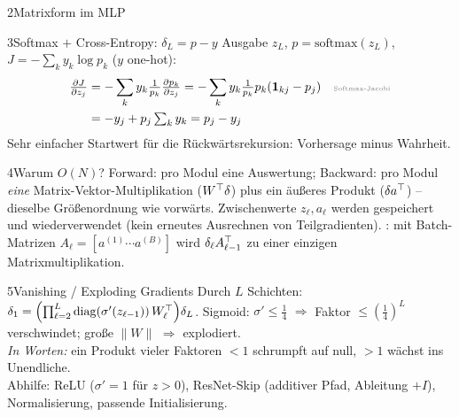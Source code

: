 \begin{hngrid}
\begin{hnp}[raster multicolumn=3,acc=hnpurple]{2}{Matrixform im MLP}
\end{hnp}
%
\begin{hnp}[raster multicolumn=3,acc=hnnavy]{3}{Softmax $+$ Cross-Entropy: $\delta_L=p-y$}
Ausgabe $z_L$, $p=\mathrm{softmax}(z_L)$, $J=-\sum_ky_k\log p_k$ ($y$ one-hot):
\begin{align*}
\tfrac{\partial J}{\partial z_j}&=-\sum_ky_k\tfrac1{p_k}\tfrac{\partial p_k}{\partial z_j}=-\sum_ky_k\tfrac1{p_k}p_k(\I_{kj}-p_j)&&\why{Softmax-Jacobi}\\
&=-y_j+p_j\textstyle\sum_ky_k=p_j-y_j
\end{align*}
Sehr einfacher Startwert für die Rückwärtsrekursion: Vorhersage minus Wahrheit.
\end{hnp}
%
\begin{hnp}[raster multicolumn=3,acc=hngreen]{4}{Warum $O(N)$?}
Forward: pro Modul eine Auswertung; Backward: pro Modul \emph{eine} Matrix-Vektor-Multiplikation ($W^{\top}\delta$) plus ein äußeres Produkt ($\delta a^{\top}$) -- dieselbe Größenordnung wie vorwärts. Zwischenwerte $z_\ell,a_\ell$ werden gespeichert und wiederverwendet (kein erneutes Ausrechnen von Teilgradienten). : mit Batch-Matrizen $A_{\ell}=[a^{(1)}\cdots a^{(B)}]$ wird $\delta_\ell A_{\ell-1}^{\top}$ zu einer einzigen Matrixmultiplikation.
\end{hnp}
%
\begin{hnp}[raster multicolumn=3,acc=hnrose]{5}{Vanishing / Exploding Gradients}
Durch $L$ Schichten: $\delta_1=\Bigl(\prod_{\ell=2}^{L}\mathrm{diag}(\sigma'(z_{\ell-1}))\,W_\ell^{\top}\Bigr)\delta_L$. Sigmoid: $\sigma'\le\frac14$ $\Rightarrow$ Faktor $\le(\frac14)^{L}$ verschwindet; große $\|W\|$ $\Rightarrow$ explodiert.\\
\emph{In Worten:} ein Produkt vieler Faktoren $<1$ schrumpft auf null, $>1$ wächst ins Unendliche.\\
Abhilfe: ReLU ($\sigma'=1$ für $z>0$), ResNet-Skip (additiver Pfad, Ableitung $+I$), Normalisierung, passende Initialisierung.
\end{hnp}

\end{hngrid}
